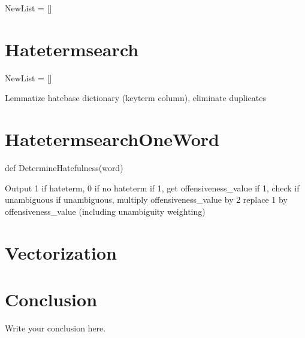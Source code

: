 \documentclass{article}
\begin{document}
\begin{algorithm}[H]
    NewList = []
    
\end{algorithm}

\section{Hatetermsearch}
\begin{algorithm}[H]
     NewList = []
    
    Lemmatize hatebase dictionary (keyterm column), eliminate duplicates
\end{algorithm}


\section{HatetermsearchOneWord}
\begin{algorithm}[H]

   def DetermineHatefulness(word)
    
    Output 1 if hateterm, 0 if no hateterm
    if 1, get offensiveness_value
    if 1, check if unambiguous
        if unambiguous, multiply offensiveness_value by 2
    replace 1 by offensiveness_value (including unambiguity weighting)
        
    
\end{algorithm}
        
        

\section{Vectorization}

\section{Conclusion}
Write your conclusion here.
\end{document}

